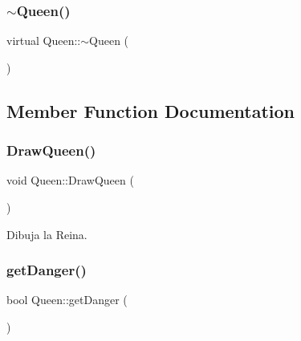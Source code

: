 \mbox{\label{class_queen_a0f8d99c83546d2e6a6d4232c6ad9bdb2}} 
\subsubsection{\texorpdfstring{$\sim$\+Queen()}{~Queen()}}
{\footnotesize\ttfamily virtual Queen\+::$\sim$\+Queen (\begin{DoxyParamCaption}{ }\end{DoxyParamCaption})\hspace{0.3cm}{\ttfamily [virtual]}}



\subsection{Member Function Documentation}
\mbox{\label{class_queen_a483a180627781a1465c981f4caf0a2c6}} 
\subsubsection{\texorpdfstring{Draw\+Queen()}{DrawQueen()}}
{\footnotesize\ttfamily void Queen\+::\+Draw\+Queen (\begin{DoxyParamCaption}{ }\end{DoxyParamCaption})}



Dibuja la Reina. 

\mbox{\label{class_queen_a8d661794a9292aa8e567bda07fe02704}} 
\subsubsection{\texorpdfstring{get\+Danger()}{getDanger()}}
{\footnotesize\ttfamily bool Queen\+::get\+Danger (\begin{DoxyParamCaption}{ }\end{DoxyParamCaption})}

\mbox{\label{class_queen_af9e50553d114a68106d189ad72c9d0a1}} 
